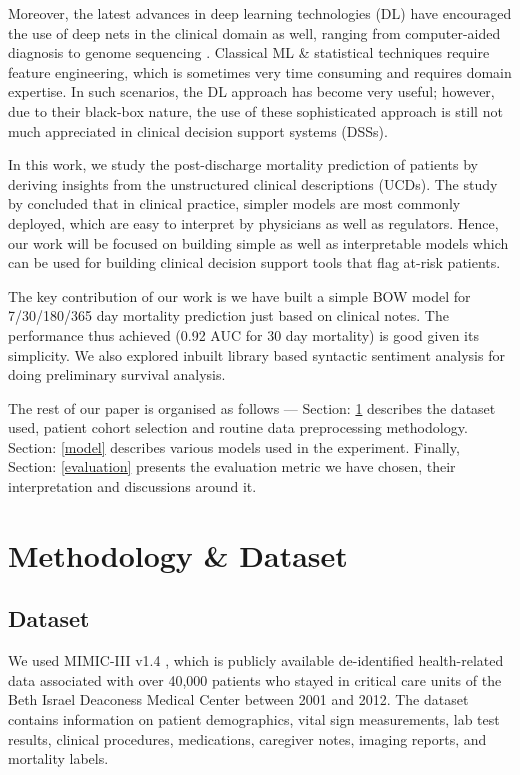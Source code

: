 \documentclass[11pt,a4paper]{article}
\begin{document}
Moreover, the latest advances in deep learning technologies (DL) have encouraged the use of deep nets in the clinical domain as well, ranging from computer-aided diagnosis to genome sequencing \cite{miotto2018deep}. Classical ML \& statistical techniques require feature engineering, which is sometimes very time consuming and requires domain expertise. In such scenarios, the DL approach has become very useful; however, due to their black-box nature, the use of these sophisticated approach is still not much appreciated in clinical decision support systems (DSSs). 


In this work, we study the post-discharge mortality prediction of patients by deriving insights from the unstructured clinical descriptions (UCDs).  The study by \citet{churpek2016multicenter} concluded that in clinical practice, simpler models are most
commonly deployed, which are easy to interpret by physicians as well as regulators.  Hence, our work will be focused on building simple as well as interpretable models which can be used for building clinical decision support tools that flag at-risk patients.

The  key contribution of our work is we have built a simple BOW model for 7/30/180/365 day mortality prediction just based on clinical notes. The performance thus achieved (0.92 AUC for 30 day mortality)  is good given its simplicity. We also explored inbuilt library based syntactic sentiment analysis for doing preliminary survival analysis.

The rest of our
paper is organised as follows --- Section: \ref{method} describes the
dataset used, patient cohort selection and routine data preprocessing methodology. Section: \ref{model} describes various models used in the experiment. Finally, Section: \ref{evaluation} presents
the evaluation metric we have chosen, their interpretation and discussions around it. 
\section{Methodology \& Dataset}\label{method}

\subsection{Dataset} We used MIMIC-III v1.4 \cite{johnson2016mimic}, which is publicly available de-identified health-related data associated with over 40,000 patients who stayed in critical care units of the Beth Israel Deaconess Medical Center between 2001 and 2012. The dataset contains information on patient demographics, vital sign measurements, lab test results, clinical procedures, medications, caregiver notes, imaging reports, and mortality labels. 
\end{document}

